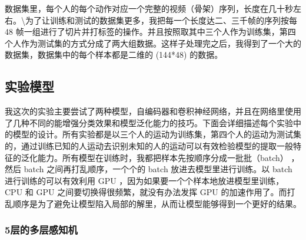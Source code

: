 数据集里，每个人的每个动作对应一个完整的视频（骨架）序列，长度在几十秒左右。\textbackslash{}为了让训练和测试的数据集更多，我把每一个长度达二、三千帧的序列按每
48
帧一组进行了切片并打标签的操作。并且按照取其中三个人作为训练集，第四个人作为测试集的方式分成了两大组数据。这样子处理完之后，我得到了一个大的数据集，数据集中的每个样本都是二维的
(144*48) 的数据。

\subsection{实验模型}\label{ux5b9eux9a8cux6a21ux578b}

我这次的实验主要尝试了两种模型，自编码器和卷积神经网络，并且在网络里使用了几种不同的能增强分类效果和模型泛化能力的技巧。下面会详细描述每个实验中的模型的设计。所有实验都是以三个人的运动为训练集，第四个人的运动为测试集的，通过训练已知的人运动去识别未知的人的运动可以有效检验模型的提取一般特征的泛化能力。所有模型在训练时，我都把样本先按顺序分成一批批（batch）
，然后 batch 之间再打乱顺序，一个个的 batch 放进去模型里进行训练。以
batch 进行训练的可以有效利用 GPU
，因为如果要一个个样本地放进模型里训练， CPU 和 GPU
之间要切换得很频繁，就没有办法发挥 GPU
的加速作用了。而打乱顺序是为了避免让模型陷入局部的解里，从而让模型能够得到一个更好的结果。

\subsubsection{5层的多层感知机}\label{ux5c42ux7684ux591aux5c42ux611fux77e5ux673a}

